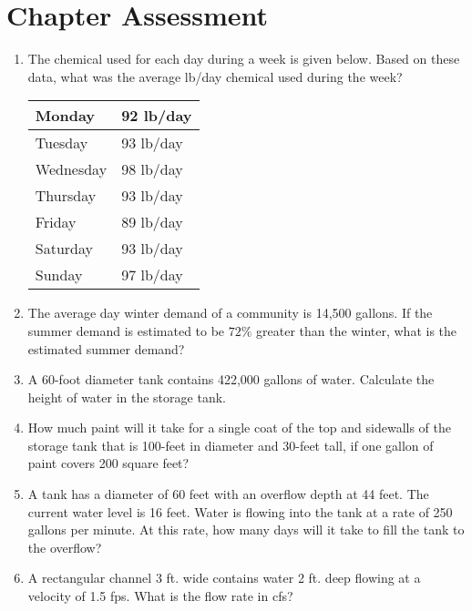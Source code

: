 \newpage
\section*{Chapter Assessment}
\begin{tcolorbox}[breakable, enhanced,
colframe=blue!25,
colback=blue!10,
coltitle=blue!20!black,  
title= Chapter Assessment]

\begin{enumerate}
\item The chemical used for each day during a week is given below. Based on these data, what was the average lb/day chemical used during the week?\\

\begin{tabular}{|l|l|}
\hline
Monday & 92 lb/day\\
\hline
Tuesday & 93 lb/day \\
\hline
Wednesday & 98 lb/day\\
\hline
Thursday & 93 lb/day \\
\hline
Friday & 89 lb/day\\
\hline
Saturday & 93 lb/day \\
\hline
Sunday & 97 lb/day\\
\hline
\end{tabular}

\item The average day winter demand of a community is 14,500 gallons. If the summer demand is estimated to be $72 \%$ greater than the winter, what is the estimated summer demand? 


\item A 60-foot diameter tank contains 422,000 gallons of water. Calculate the height of water in the storage tank.

\item How much paint will it take for a single coat of the top and sidewalls of the storage tank that is 100-feet in diameter and 30-feet tall, if one gallon of paint covers 200 square feet?\\

\item A tank has a diameter of 60 feet with an overflow depth at 44 feet. The current water level is 16 feet. Water is flowing into the tank at a rate of 250 gallons per minute. At this rate, how many days will it take to fill the tank to the overflow?

\item A rectangular channel 3 ft. wide contains water 2 ft. deep flowing at a velocity of 1.5 fps.
What is the flow rate in cfs?


\end{enumerate}
\end{tcolorbox}
